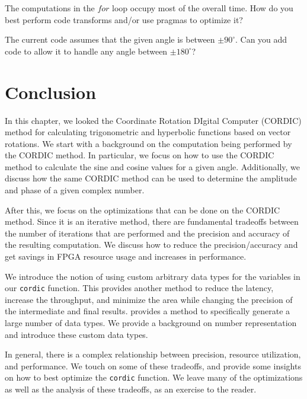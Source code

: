 \begin{exercise}
The computations in the $for$ loop occupy most of the overall time. How do you best perform code transforms and/or use pragmas to optimize it?
\end{exercise}

\begin{exercise}
The current code assumes that the given angle is between $\pm 90^{\circ}$. Can you add code to allow it to handle any angle between $\pm 180^{\circ}$?
\end{exercise}

\section{Conclusion}
In this chapter, we looked the Coordinate Rotation DIgital Computer (CORDIC) method for calculating trigonometric and hyperbolic functions based on vector rotations. We start with a background on the computation being performed by the CORDIC method. In particular, we focus on how to use the CORDIC method to calculate the sine and cosine values for a given angle. Additionally, we discuss how the same CORDIC method can be used to determine the amplitude and phase of a given complex number.

After this, we focus on the optimizations that can be done on the CORDIC method. Since it is an iterative method, there are fundamental tradeoffs between the number of iterations that are performed and the precision and accuracy of the resulting computation. We discuss how to reduce the precision/accuracy and get savings in FPGA resource usage and increases in performance.

We introduce the notion of using custom arbitrary data types for the variables in our \lstinline{cordic} function. This provides another method to reduce the latency, increase the throughput, and minimize the area while changing the precision of the intermediate and final results. \VHLS provides a method to specifically generate a large number of data types. We provide a background on number representation and introduce these custom data types. 

In general, there is a complex relationship between precision, resource utilization, and performance. We touch on some of these tradeoffs, and provide some insights on how to best optimize the \lstinline{cordic} function. We leave many of the optimizations as well as the analysis of these tradeoffs, as an exercise to the reader. %
